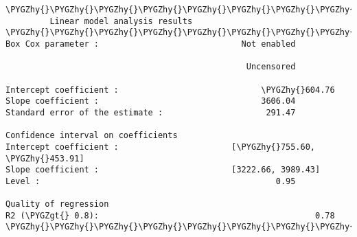 \documentclass[letterpaper,10pt,english]{sphinxmanual}
\def\PYGZgt{\char`\>}
\def\PYGZhy{\char`\-}
\begin{document}
\begin{Verbatim}[commandchars=\\\{\}]
\PYGZhy{}\PYGZhy{}\PYGZhy{}\PYGZhy{}\PYGZhy{}\PYGZhy{}\PYGZhy{}\PYGZhy{}\PYGZhy{}\PYGZhy{}\PYGZhy{}\PYGZhy{}\PYGZhy{}\PYGZhy{}\PYGZhy{}\PYGZhy{}\PYGZhy{}\PYGZhy{}\PYGZhy{}\PYGZhy{}\PYGZhy{}\PYGZhy{}\PYGZhy{}\PYGZhy{}\PYGZhy{}\PYGZhy{}\PYGZhy{}\PYGZhy{}\PYGZhy{}\PYGZhy{}\PYGZhy{}\PYGZhy{}\PYGZhy{}\PYGZhy{}\PYGZhy{}\PYGZhy{}\PYGZhy{}\PYGZhy{}\PYGZhy{}\PYGZhy{}\PYGZhy{}\PYGZhy{}\PYGZhy{}\PYGZhy{}\PYGZhy{}\PYGZhy{}\PYGZhy{}\PYGZhy{}\PYGZhy{}\PYGZhy{}\PYGZhy{}\PYGZhy{}\PYGZhy{}\PYGZhy{}\PYGZhy{}\PYGZhy{}\PYGZhy{}\PYGZhy{}\PYGZhy{}\PYGZhy{}\PYGZhy{}\PYGZhy{}\PYGZhy{}\PYGZhy{}\PYGZhy{}\PYGZhy{}\PYGZhy{}\PYGZhy{}\PYGZhy{}\PYGZhy{}\PYGZhy{}\PYGZhy{}\PYGZhy{}\PYGZhy{}\PYGZhy{}\PYGZhy{}\PYGZhy{}\PYGZhy{}\PYGZhy{}\PYGZhy{}
         Linear model analysis results
\PYGZhy{}\PYGZhy{}\PYGZhy{}\PYGZhy{}\PYGZhy{}\PYGZhy{}\PYGZhy{}\PYGZhy{}\PYGZhy{}\PYGZhy{}\PYGZhy{}\PYGZhy{}\PYGZhy{}\PYGZhy{}\PYGZhy{}\PYGZhy{}\PYGZhy{}\PYGZhy{}\PYGZhy{}\PYGZhy{}\PYGZhy{}\PYGZhy{}\PYGZhy{}\PYGZhy{}\PYGZhy{}\PYGZhy{}\PYGZhy{}\PYGZhy{}\PYGZhy{}\PYGZhy{}\PYGZhy{}\PYGZhy{}\PYGZhy{}\PYGZhy{}\PYGZhy{}\PYGZhy{}\PYGZhy{}\PYGZhy{}\PYGZhy{}\PYGZhy{}\PYGZhy{}\PYGZhy{}\PYGZhy{}\PYGZhy{}\PYGZhy{}\PYGZhy{}\PYGZhy{}\PYGZhy{}\PYGZhy{}\PYGZhy{}\PYGZhy{}\PYGZhy{}\PYGZhy{}\PYGZhy{}\PYGZhy{}\PYGZhy{}\PYGZhy{}\PYGZhy{}\PYGZhy{}\PYGZhy{}\PYGZhy{}\PYGZhy{}\PYGZhy{}\PYGZhy{}\PYGZhy{}\PYGZhy{}\PYGZhy{}\PYGZhy{}\PYGZhy{}\PYGZhy{}\PYGZhy{}\PYGZhy{}\PYGZhy{}\PYGZhy{}\PYGZhy{}\PYGZhy{}\PYGZhy{}\PYGZhy{}\PYGZhy{}\PYGZhy{}
Box Cox parameter :                             Not enabled

                                                 Uncensored

Intercept coefficient :                             \PYGZhy{}604.76
Slope coefficient :                                 3606.04
Standard error of the estimate :                     291.47

Confidence interval on coefficients
Intercept coefficient :                       [\PYGZhy{}755.60, \PYGZhy{}453.91]
Slope coefficient :                           [3222.66, 3989.43]
Level :                                                0.95

Quality of regression
R2 (\PYGZgt{} 0.8):                                            0.78
\PYGZhy{}\PYGZhy{}\PYGZhy{}\PYGZhy{}\PYGZhy{}\PYGZhy{}\PYGZhy{}\PYGZhy{}\PYGZhy{}\PYGZhy{}\PYGZhy{}\PYGZhy{}\PYGZhy{}\PYGZhy{}\PYGZhy{}\PYGZhy{}\PYGZhy{}\PYGZhy{}\PYGZhy{}\PYGZhy{}\PYGZhy{}\PYGZhy{}\PYGZhy{}\PYGZhy{}\PYGZhy{}\PYGZhy{}\PYGZhy{}\PYGZhy{}\PYGZhy{}\PYGZhy{}\PYGZhy{}\PYGZhy{}\PYGZhy{}\PYGZhy{}\PYGZhy{}\PYGZhy{}\PYGZhy{}\PYGZhy{}\PYGZhy{}\PYGZhy{}\PYGZhy{}\PYGZhy{}\PYGZhy{}\PYGZhy{}\PYGZhy{}\PYGZhy{}\PYGZhy{}\PYGZhy{}\PYGZhy{}\PYGZhy{}\PYGZhy{}\PYGZhy{}\PYGZhy{}\PYGZhy{}\PYGZhy{}\PYGZhy{}\PYGZhy{}\PYGZhy{}\PYGZhy{}\PYGZhy{}\PYGZhy{}\PYGZhy{}\PYGZhy{}\PYGZhy{}\PYGZhy{}\PYGZhy{}\PYGZhy{}\PYGZhy{}\PYGZhy{}\PYGZhy{}\PYGZhy{}\PYGZhy{}\PYGZhy{}\PYGZhy{}\PYGZhy{}\PYGZhy{}\PYGZhy{}\PYGZhy{}\PYGZhy{}\PYGZhy{}


\end{Verbatim}
\end{document}
